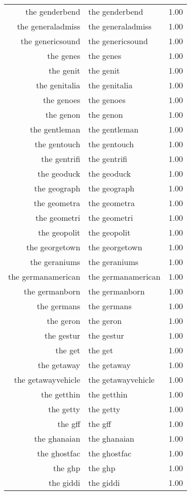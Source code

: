 \begin{table}[ht]
\begin{tabular}{rlr}
  the genderbend & the genderbend & 1.00 \\ 
  the generaladmiss & the generaladmiss & 1.00 \\ 
  the genericsound & the genericsound & 1.00 \\ 
  the genes & the genes & 1.00 \\ 
  the genit & the genit & 1.00 \\ 
  the genitalia & the genitalia & 1.00 \\ 
  the genoes & the genoes & 1.00 \\ 
  the genon & the genon & 1.00 \\ 
  the gentleman & the gentleman & 1.00 \\ 
  the gentouch & the gentouch & 1.00 \\ 
  the gentrifi & the gentrifi & 1.00 \\ 
  the geoduck & the geoduck & 1.00 \\ 
  the geograph & the geograph & 1.00 \\ 
  the geometra & the geometra & 1.00 \\ 
  the geometri & the geometri & 1.00 \\ 
  the geopolit & the geopolit & 1.00 \\ 
  the georgetown & the georgetown & 1.00 \\ 
  the geraniums & the geraniums & 1.00 \\ 
  the germanamerican & the germanamerican & 1.00 \\ 
  the germanborn & the germanborn & 1.00 \\ 
  the germans & the germans & 1.00 \\ 
  the geron & the geron & 1.00 \\ 
  the gestur & the gestur & 1.00 \\ 
  the get & the get & 1.00 \\ 
  the getaway & the getaway & 1.00 \\ 
  the getawayvehicle & the getawayvehicle & 1.00 \\ 
  the getthin & the getthin & 1.00 \\ 
  the getty & the getty & 1.00 \\ 
  the gff & the gff & 1.00 \\ 
  the ghanaian & the ghanaian & 1.00 \\ 
  the ghostfac & the ghostfac & 1.00 \\ 
  the ghp & the ghp & 1.00 \\ 
  the giddi & the giddi & 1.00 \\ 

\end{tabular}
\end{table}
